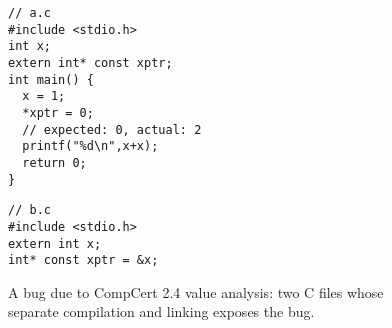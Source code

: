 
\begin{figure}
\begin{minipage}[t]{0.57\columnwidth}
\begin{verbatim}
// a.c             
#include <stdio.h> 
int x;
extern int* const xptr;
int main() {
  x = 1;
  *xptr = 0;
  // expected: 0, actual: 2
  printf("%d\n",x+x);
  return 0;
}
\end{verbatim}
\end{minipage}\begin{minipage}[t]{0.43\columnwidth}
\begin{verbatim}
// b.c
#include <stdio.h>          
extern int x;
int* const xptr = &x;
\end{verbatim}
\end{minipage}
\caption{A bug due to CompCert 2.4 value analysis: two C files whose separate compilation and linking exposes the bug.}
\label{fig:sepcomp:constprop-bug}
\end{figure}


